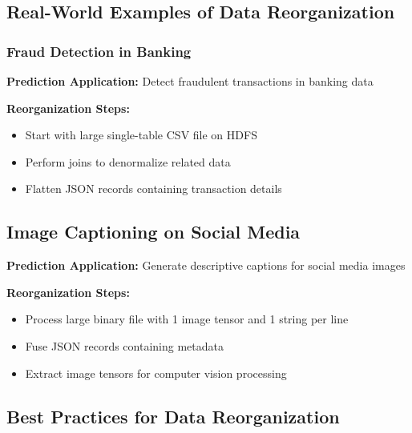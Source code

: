 \documentclass[12pt]{article}
\begin{document}
\subsection{Real-World Examples of Data Reorganization}

\subsubsection{Fraud Detection in Banking}
\begin{tcolorbox}[colback=blue!5!white,colframe=blue!75!black,title={Example: Fraud Detection in Banking}]
\textbf{Prediction Application:} Detect fraudulent transactions in banking data

\textbf{Reorganization Steps:}
\begin{itemize}
    \item Start with large single-table CSV file on HDFS
    \item Perform joins to denormalize related data
    \item Flatten JSON records containing transaction details
\end{itemize}
\end{tcolorbox}

\subsection{Image Captioning on Social Media}
\begin{tcolorbox}[colback=blue!5!white,colframe=blue!75!black,title={Example: Image Captioning on Social Media}]
\textbf{Prediction Application:} Generate descriptive captions for social media images

\textbf{Reorganization Steps:}
\begin{itemize}
    \item Process large binary file with 1 image tensor and 1 string per line
    \item Fuse JSON records containing metadata
    \item Extract image tensors for computer vision processing
\end{itemize}
\end{tcolorbox}

\subsection{Best Practices for Data Reorganization}
\end{document}
